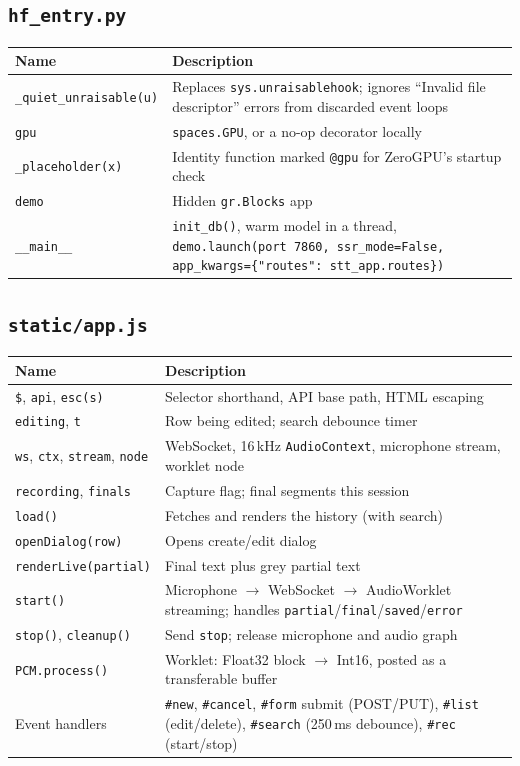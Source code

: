 \documentclass[11pt,a4paper]{article}
\begin{document}
\subsection{\texttt{hf\_entry.py}}
\begin{longtable}{@{}p{4.6cm}p{10.6cm}@{}}
\toprule
\textbf{Name} & \textbf{Description}\\
\midrule
\endhead
\texttt{\_quiet\_unraisable(u)} & Replaces \texttt{sys.unraisablehook}; ignores ``Invalid file descriptor'' errors from discarded event loops\\
\texttt{gpu} & \texttt{spaces.GPU}, or a no-op decorator locally\\
\texttt{\_placeholder(x)} & Identity function marked \texttt{@gpu} for ZeroGPU's startup check\\
\texttt{demo} & Hidden \texttt{gr.Blocks} app\\
\texttt{\_\_main\_\_} & \texttt{init\_db()}, warm model in a thread, \texttt{demo.launch(port 7860, ssr\_mode=False, app\_kwargs=\{"routes": stt\_app.routes\})}\\
\bottomrule
\end{longtable}

\subsection{\texttt{static/app.js}}
\begin{longtable}{@{}p{4.6cm}p{10.6cm}@{}}
\toprule
\textbf{Name} & \textbf{Description}\\
\midrule
\endhead
\texttt{\$}, \texttt{api}, \texttt{esc(s)} & Selector shorthand, API base path, HTML escaping\\
\texttt{editing}, \texttt{t} & Row being edited; search debounce timer\\
\texttt{ws}, \texttt{ctx}, \texttt{stream}, \texttt{node} & WebSocket, 16\,kHz \texttt{AudioContext}, microphone stream, worklet node\\
\texttt{recording}, \texttt{finals} & Capture flag; final segments this session\\
\texttt{load()} & Fetches and renders the history (with search)\\
\texttt{openDialog(row)} & Opens create/edit dialog\\
\texttt{renderLive(partial)} & Final text plus grey partial text\\
\texttt{start()} & Microphone $\to$ WebSocket $\to$ AudioWorklet streaming; handles \texttt{partial}/\texttt{final}/\texttt{saved}/\texttt{error}\\
\texttt{stop()}, \texttt{cleanup()} & Send \texttt{stop}; release microphone and audio graph\\
\texttt{PCM.process()} & Worklet: Float32 block $\to$ Int16, posted as a transferable buffer\\
Event handlers & \texttt{\#new}, \texttt{\#cancel}, \texttt{\#form} submit (POST/PUT), \texttt{\#list} (edit/delete), \texttt{\#search} (250\,ms debounce), \texttt{\#rec} (start/stop)\\
\bottomrule
\end{longtable}
\end{document}
